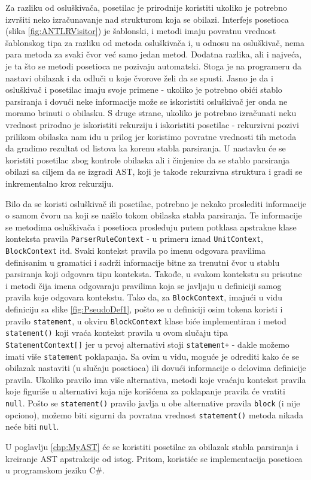 Za razliku od osluškivača, posetilac je prirodnije koristiti ukoliko je potrebno izvršiti neko izračunavanje nad strukturom koja se obilazi. Interfejs posetioca (slika \ref{fig:ANTLRVisitor}) je šablonski, i metodi imaju povratnu vrednost šablonskog tipa za razliku od metoda osluškivača i, u odnosu na osluškivač, nema para metoda za svaki čvor već samo jedan metod. Dodatna razlika, ali i najveća, je ta što se metodi posetioca ne pozivaju automatski. Stoga je na programeru da nastavi obilazak i da odluči u koje čvorove želi da se spusti. Jasno je da i osluškivač i posetilac imaju svoje primene - ukoliko je potrebno obići stablo parsiranja i dovući neke informacije može se iskoristiti osluškivač jer onda ne moramo brinuti o obilasku. S druge strane, ukoliko je potrebno izračunati neku vrednost prirodno je iskoristiti rekurziju i iskoristiti posetilac - rekurzivni pozivi prilikom obilaska nam idu u prilog jer koristimo povratne vrednosti tih metoda da gradimo rezultat od listova ka korenu stabla parsiranja. U nastavku će se koristiti posetilac zbog kontrole obilaska ali i činjenice da se stablo parsiranja obilazi sa ciljem da se izgradi AST, koji je takođe rekurzivna struktura i gradi se inkrementalno kroz rekurziju.

Bilo da se koristi osluškivač ili posetilac, potrebno je nekako proslediti informacije o samom čvoru na koji se naišlo tokom obilaska stabla parsiranja. Te informacije se metodima osluškivača i posetioca prosleđuju putem potklasa apstrakne klase konteksta pravila \texttt{ParserRuleContext} - u primeru iznad \texttt{UnitContext}, \texttt{BlockContext} itd. Svaki kontekst pravila po imenu odgovara pravilima definisanim u gramatici i sadrži informacije bitne za trenutni čvor u stablu parsiranja koji odgovara tipu konteksta. Takođe, u svakom kontekstu su prisutne i metodi čija imena odgovaraju pravilima koja se javljaju u definiciji samog pravila koje odgovara kontekstu. Tako da, za \texttt{BlockContext}, imajući u vidu definiciju sa slike \ref{fig:PseudoDef1}, pošto se u definiciji osim tokena koristi i pravilo \texttt{statement}, u okviru \texttt{BlockContext} klase biće implementiran i metod \texttt{statement()} koji vraća kontekst pravila u ovom slučaju tipa \texttt{StatementContext[]} jer u prvoj alternativi stoji \texttt{statement+} - dakle možemo imati više \texttt{statement} poklapanja. Sa ovim u vidu, moguće je odrediti kako će se obilazak nastaviti (u slučaju posetioca) ili dovući informacije o delovima definicije pravila. Ukoliko pravilo ima više alternativa, metodi koje vraćaju kontekst pravila koje figuriše u alternativi koja nije korišćena za poklapanje pravila će vratiti \texttt{null}. Pošto se \texttt{statement()} pravilo javlja u obe alternative pravila \texttt{block} (i nije opciono), možemo biti sigurni da povratna vrednost \texttt{statement()} metoda nikada neće biti \texttt{null}.

U poglavlju \ref{chp:MyAST} će se koristiti posetilac za obilazak stabla parsiranja i kreiranje AST apstrakcije od istog. Pritom, koristiće se implementacija posetioca u programskom jeziku C\#. 
